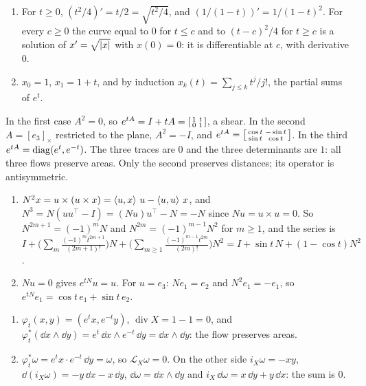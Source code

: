 \section{}

\begin{enumerate}[nosep]
  \item For $t\geq0$, $(t^2/4)' = t/2 = \sqrt{t^2/4}$, and
        $(1/(1 - t))' = 1/(1 - t)^2$. For every $c\geq0$ the curve
        equal to $0$ for $t\leq c$ and to $(t - c)^2/4$ for $t\geq c$
        is a solution of $x' = \sqrt{\left|x\right|}$ with $x(0) = 0$: it is
        differentiable at $c$, with derivative $0$.
  \item $x_0 = 1$, $x_1 = 1 + t$, and by induction
        $x_k(t) = \sum_{j\leq k}t^j/j!$, the partial sums of $e^t$.
\end{enumerate}

In the first case $A^2 = 0$, so
$e^{tA} = I + tA
= \begin{bsmallmatrix}1 & t\\ 0 & 1\end{bsmallmatrix}$, a shear. In
the second $A = [e_3]_\times$ restricted to the plane, $A^2 = -I$, and
$e^{tA} = \begin{bsmallmatrix}\cos t & -\sin t\\ \sin t & \cos t
\end{bsmallmatrix}$. In the third
$e^{tA} = \operatorname{diag}(e^t, e^{-t})$. The three traces are $0$ and the three
determinants are $1$: all three flows preserve areas. Only the second
preserves distances; its operator is antisymmetric.

\begin{enumerate}[nosep]
  \item $N^2x = u\times(u\times x) = \left\langle u, x \right\rangle\,u - \left\langle u, u \right\rangle\,x$, and
        $N^3 = N(uu^\top - I) = (Nu)u^\top - N = -N$ since
        $Nu = u\times u = 0$. So $N^{2m+1} = (-1)^mN$ and
        $N^{2m} = (-1)^{m-1}N^2$ for $m\geq1$, and the series is
        $I + \bigl(\sum_m\frac{(-1)^mt^{2m+1}}{(2m+1)!}\bigr)N
        + \bigl(\sum_{m\geq1}\frac{(-1)^{m-1}t^{2m}}{(2m)!}\bigr)N^2
        = I + \sin t\,N + (1 - \cos t)N^2$.
  \item $Nu = 0$ gives $e^{tN}u = u$. For $u = e_3$:
        $Ne_1 = e_2$ and $N^2e_1 = -e_1$, so
        $e^{tN}e_1 = \cos t\,e_1 + \sin t\,e_2$.
\end{enumerate}

\begin{enumerate}[nosep]
  \item $\varphi_t(x, y) = (e^tx, e^{-t}y)$,
        $\operatorname{div}X = 1 - 1 = 0$, and
        $\varphi_t^*(\dd x\wedge\dd y)
        = e^t\,\dd x\wedge e^{-t}\,\dd y = \dd x\wedge\dd y$: the flow
        preserves areas.
  \item $\varphi_t^*\omega = e^tx\cdot e^{-t}\,\dd y = \omega$, so
        $\mathcal L_X\omega = 0$. On the other side
        $i_X\omega = -xy$, $\dd(i_X\omega) = -y\,\dd x - x\,\dd y$,
        $\dd\omega = \dd x\wedge\dd y$ and
        $i_X\,\dd\omega = x\,\dd y + y\,\dd x$: the sum is $0$.
\end{enumerate}

